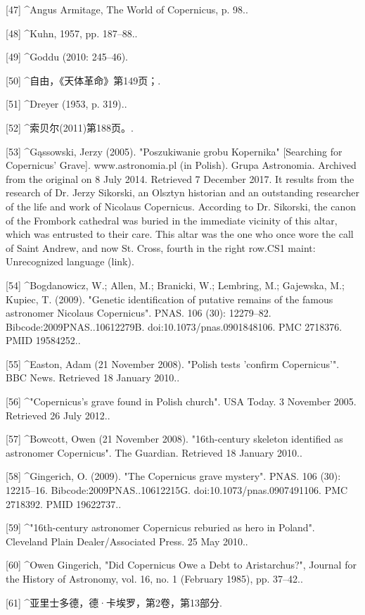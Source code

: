 [47]
^Angus Armitage, The World of Copernicus, p. 98..

[48]
^Kuhn, 1957, pp. 187–88..

[49]
^Goddu (2010: 245–46).

[50]
^自由，《天体革命》第149页；.

[51]
^Dreyer (1953, p. 319)..

[52]
^索贝尔(2011)第188页。.

[53]
^Gąssowski, Jerzy (2005). "Poszukiwanie grobu Kopernika" [Searching for Copernicus' Grave]. www.astronomia.pl (in Polish). Grupa Astronomia. Archived from the original on 8 July 2014. Retrieved 7 December 2017. It results from the research of Dr. Jerzy Sikorski, an Olsztyn historian and an outstanding researcher of the life and work of Nicolaus Copernicus. According to Dr. Sikorski, the canon of the Frombork cathedral was buried in the immediate vicinity of this altar, which was entrusted to their care. This altar was the one who once wore the call of Saint Andrew, and now St. Cross, fourth in the right row.CS1 maint: Unrecognized language (link).

[54]
^Bogdanowicz, W.; Allen, M.; Branicki, W.; Lembring, M.; Gajewska, M.; Kupiec, T. (2009). "Genetic identification of putative remains of the famous astronomer Nicolaus Copernicus". PNAS. 106 (30): 12279–82. Bibcode:2009PNAS..10612279B. doi:10.1073/pnas.0901848106. PMC 2718376. PMID 19584252..

[55]
^Easton, Adam (21 November 2008). "Polish tests 'confirm Copernicus'". BBC News. Retrieved 18 January 2010..

[56]
^"Copernicus's grave found in Polish church". USA Today. 3 November 2005. Retrieved 26 July 2012..

[57]
^Bowcott, Owen (21 November 2008). "16th-century skeleton identified as astronomer Copernicus". The Guardian. Retrieved 18 January 2010..

[58]
^Gingerich, O. (2009). "The Copernicus grave mystery". PNAS. 106 (30): 12215–16. Bibcode:2009PNAS..10612215G. doi:10.1073/pnas.0907491106. PMC 2718392. PMID 19622737..

[59]
^"16th-century astronomer Copernicus reburied as hero in Poland". Cleveland Plain Dealer/Associated Press. 25 May 2010..

[60]
^Owen Gingerich, "Did Copernicus Owe a Debt to Aristarchus?", Journal for the History of Astronomy, vol. 16, no. 1 (February 1985), pp. 37–42..

[61]
^亚里士多德，德·卡埃罗，第2卷，第13部分.

